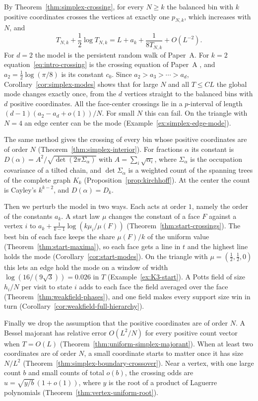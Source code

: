 \documentclass[11pt]{article}
\theoremstyle{definition}
\theoremstyle{remark}
\begin{document}
By Theorem~\ref{thm:simplex-crossing}, for every $N\ge k$ the balanced bin with
$k$ positive coordinates crosses the vertices at exactly one $p_{N,k}$, which
increases with $N$, and
\begin{equation}\label{eq:intro-crossing}
T_{N,k}+\frac12\log T_{N,k}=L+a_k+\frac1{8T_{N,k}}+O(L^{-2}).
\end{equation}
For $d=2$ the model is the persistent random walk of Paper~A. For $k=2$
equation~\eqref{eq:intro-crossing} is the crossing equation of Paper~A
\cite[Proposition~3.8]{paperA}, and $a_2=\frac12\log(\pi/8)$ is its constant
$c_0$. Since $a_2>a_3>\cdots>a_d$, Corollary~\ref{cor:simplex-modes} shows that
for large $N$ and all $T\le CL$ the global mode changes exactly once, from the
$d$ vertices straight to the balanced bins with $d$ positive coordinates. All the
face-center crossings lie in a $p$-interval of length $(d-1)(a_2-a_d+o(1))/N$.
For small $N$ this can fail. On the triangle with $N=4$ an edge center can be
the mode (Example~\ref{ex:simplex-edge-mode}).

The same method gives the crossing of every bin whose positive coordinates are
of order $N$ (Theorem~\ref{thm:simplex-interior}). For fractions $\alpha$ its
constant is $D(\alpha)=A^2/\sqrt{\det(2\pi\Sigma_\alpha)}$ with
$A=\sum_i\sqrt{\alpha_i}$, where $\Sigma_\alpha$ is the occupation covariance of
a tilted chain, and $\det\Sigma_\alpha$ is a weighted count of the spanning
trees of the complete graph $K_k$ (Proposition~\ref{prop:kirchhoff}). At the
center the count is Cayley's $k^{k-2}$, and $D(\alpha)=D_k$.

Then we perturb the model in two ways. Each acts at order $1$, namely the
order of the constants $a_k$. A start law $\mu$ changes the constant of a face
$F$ against a vertex $i$ to $a_k+\frac1{k-1}\log(k\mu_i/\mu(F))$
(Theorem~\ref{thm:start-crossings}). The best bin of each face keeps the share
$\mu(F)/k$ of the uniform value (Theorem~\ref{thm:start-maxima}), so each face
gets a line in $t$ and the highest line holds the mode
(Corollary~\ref{cor:start-modes}). On the triangle with
$\mu=(\frac12,\frac12,0)$ this lets an edge hold the mode on a window of width
$\log(16/(9\sqrt3))=0.026$ in $T$ (Example~\ref{ex:K3-start}). A Potts field of
size $h_i/N$ per visit to state $i$ adds to each face the field averaged over
the face (Theorem~\ref{thm:weakfield-phases}), and one field makes every support
size win in turn (Corollary~\ref{cor:weakfield-full-hierarchy}).

Finally we drop the assumption that the positive coordinates are of order $N$.
A Bessel majorant has relative error $O(L^2/N)$ for every positive count vector
when $T=O(L)$ (Theorem~\ref{thm:uniform-simplex-majorant}). When at least two
coordinates are of order $N$, a small coordinate starts to matter once it has
size $N/L^2$ (Theorem~\ref{thm:simplex-boundary-crossover}). Near a vertex,
with one large count $b$ and small counts of total $o(b)$, the crossing odds
are $u=\sqrt{y/b}\,(1+o(1))$, where $y$ is the root of a product of Laguerre
polynomials (Theorem~\ref{thm:vertex-uniform-root}).
\end{document}
